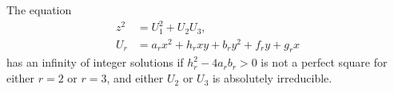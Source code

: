 \begin{proposition}\label{eq:154}
    The equation
\[
    \begin{aligned}z^2&=U_1^2+U_2U_3,\\U_r&=a_rx^2+h_rxy+b_ry^2+f_ry+g_rx\end{aligned}
\]
    has an infinity of integer solutions if $h_r^2-4a_rb_r>0$ is not a perfect square for either $r=2$ or $r=3$, and either $U_2$ or $U_3$ is absolutely irreducible.
\end{proposition}
